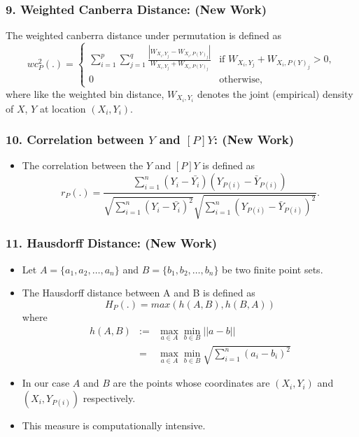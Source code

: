 \documentclass{beamer}
\begin{document}
\begin{frame}
\frametitle{9. Weighted Canberra Distance: (New Work)}
The weighted canberra distance under permutation is defined as 
\[
wc_P^2(.) = \left \{ 
\begin{array}{ll}
\sum_{i=1}^p \sum_{j=1}^q \frac{ |W_{X_i,Y_j} - W_{X_i,P(Y)_j}|}{ W_{X_i,Y_j} + W_{X_i,P(Y)_j}} & \text{if } W_{X_i,Y_j} + W_{X_i,P(Y)_j} > 0,\\
0 & \text{otherwise},
\end{array} \right.
\] 
where like the weighted bin distance, $W_{X_i,Y_i}$ denotes the joint (empirical) density of $X$, $Y$ at location $(X_i, Y_i)$. 

\end{frame}

\begin{frame}
\frametitle{10. Correlation between $Y$ and $[P]Y$: (New Work)}
\begin{itemize} 
\item The correlation between the $Y$ and $[P]Y$ is defined as
\[
r_P(.) = \frac{ \sum_{i=1}^n (Y_i - \bar{Y_i})(Y_{P(i)} - \bar{Y}_{P(i)})}{\sqrt{\sum_{i=1}^n (Y_i - \bar{Y_i})^2}\sqrt{\sum_{i=1}^n (Y_{P(i)}- \bar{Y}_{P(i)})^2}}.
\]
\end{itemize}
\end{frame}

\begin{frame}
\frametitle{11. Hausdorff Distance: (New Work)}
\begin{itemize}
\item Let $A = \{a_1, a_2, \dots, a_n\}$ and $B = \{b_1, b_2, \dots, b_n\}$ be two finite point sets. 
\item The Hausdorff distance between A and B is defined as
 \[
H_P(.)  = max (h(A, B), h(B, A))
\]
where 
\begin{eqnarray*}
h(A, B) &:=& \max_{a \in A} \min_{b \in B} ||a - b|| \\ & = & \max_{a \in A} \min_{b \in B} \sqrt{\sum_{i=1}^n (a_i - b_i)^2}
\end{eqnarray*}
\item In our case $A$ and $B$ are the points whose coordinates are $(X_i, Y_i)$ and $(X_i, Y_{P(i)})$ respectively. 
\item This measure is computationally intensive.

\end{itemize}

\end{frame}
\end{document}
